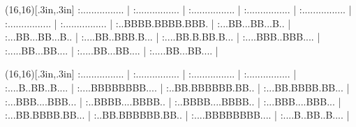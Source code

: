 \sprite{\Ammo}(16,16)[.3in,.3in]
:................ |
:................ |
:................ |
:................ |
:................ |
:................ |
:................ |
:..BBBB.BBBB.BBB. |
:...BB...BB...B.. |
:...BB...BB...B.. |
:....BB..BBB.B... |
:....BB.B.BB.B... |
:....BBB..BBB.... |
:.....BB...BB.... |
:.....BB...BB.... |
:.....BB...BB.... |
\endsprite

\sprite{\Outpost}(16,16)[.3in,.3in]
:................ |
:................ |
:................ |
:................ |
:....B..BB..B.... |
:....BBBBBBBB.... |
:..BB.BBBBBB.BB.. |
:...BB.BBBB.BB... |
:...BBB....BBB... |
:..BBBB....BBBB.. |
:..BBBB....BBBB.. |
:...BBB....BBB... |
:...BB.BBBB.BB... |
:..BB.BBBBBB.BB.. |
:....BBBBBBBB.... |
:....B..BB..B.... |
\endsprite

